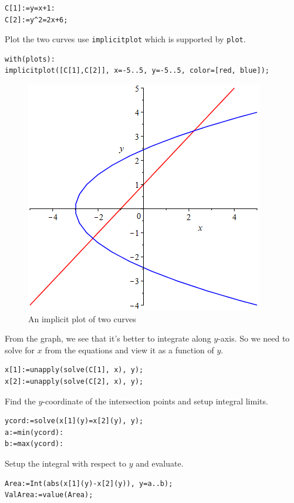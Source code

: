 \documentclass[]{book}
\theoremstyle{definition}
\theoremstyle{definition}
\theoremstyle{definition}
\theoremstyle{remark}
\begin{document}
\begin{verbatim}
C[1]:=y=x+1:
C[2]:=y^2=2x+6;
\end{verbatim}

Plot the two curves use \texttt{implicitplot} which is supported by \texttt{plot}.

\begin{verbatim}
with(plots):
implicitplot([C[1],C[2]], x=-5..5, y=-5..5, color=[red, blue]);
\end{verbatim}

\begin{figure}
\centering
\includegraphics{figs/Area-between-two-curves-y.png}
\caption{An implicit plot of two curves}
\end{figure}

From the graph, we see that it's better to integrate along \(y\)-axis. So we need to solve for \(x\) from the equations and view it as a function of \(y\).

\begin{verbatim}
x[1]:=unapply(solve(C[1], x), y);
x[2]:=unapply(solve(C[2], x), y);
\end{verbatim}

Find the \(y\)-coordinate of the intersection points and setup integral limits.

\begin{verbatim}
ycord:=solve(x[1](y)=x[2](y), y);
a:=min(ycord):
b:=max(ycord):
\end{verbatim}

Setup the integral with respect to \(y\) and evaluate.

\begin{verbatim}
Area:=Int(abs(x[1](y)-x[2](y)), y=a..b);
ValArea:=value(Area);
\end{verbatim}
\end{document}
